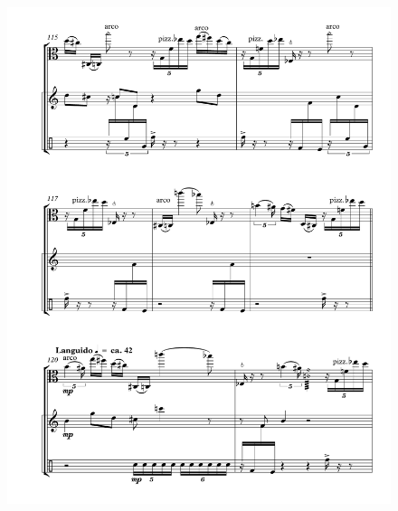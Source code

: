 \begin{figure}[htbp]
    \centering
	\includegraphics[width=6.5in]{figures/Viola_Percussion_16.pdf}
\end{figure}

